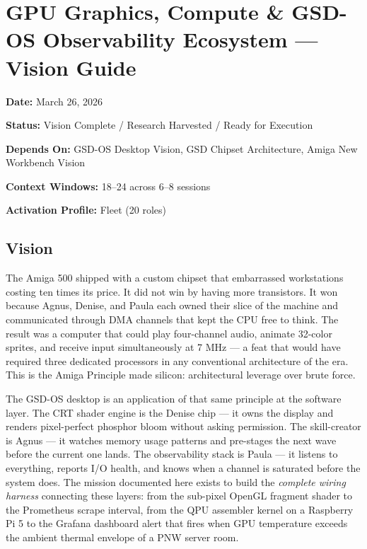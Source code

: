 \documentclass[11pt,letterpaper]{article}
\newcommand{\stageheader}[2]{%
  \noindent\colorbox{#2}{\makebox[\textwidth][l]{%
    \textcolor{white}{\bfseries\sffamily\hspace{6pt}#1\hspace{6pt}}}}%
  \vspace{0.5em}\par%
}
\newcommand{\metafield}[2]{\textbf{\sffamily #1} #2\par}
\begin{document}

\stageheader{STAGE 1 --- VISION DOCUMENT}{primary}

\section{GPU Graphics, Compute \& GSD-OS Observability Ecosystem --- Vision Guide}

\metafield{Date:}{March 26, 2026}
\metafield{Status:}{Vision Complete / Research Harvested / Ready for Execution}
\metafield{Depends On:}{GSD-OS Desktop Vision, GSD Chipset Architecture, Amiga New Workbench Vision}
\metafield{Context Windows:}{18--24 across 6--8 sessions}
\metafield{Activation Profile:}{Fleet (20 roles)}

\subsection{Vision}

The Amiga 500 shipped with a custom chipset that embarrassed workstations costing ten times its price. It did not win by having more transistors. It won because Agnus, Denise, and Paula each owned their slice of the machine and communicated through DMA channels that kept the CPU free to think. The result was a computer that could play four-channel audio, animate 32-color sprites, and receive input simultaneously at 7 MHz — a feat that would have required three dedicated processors in any conventional architecture of the era. This is the Amiga Principle made silicon: architectural leverage over brute force.

The GSD-OS desktop is an application of that same principle at the software layer. The CRT shader engine is the Denise chip — it owns the display and renders pixel-perfect phosphor bloom without asking permission. The skill-creator is Agnus — it watches memory usage patterns and pre-stages the next wave before the current one lands. The observability stack is Paula — it listens to everything, reports I/O health, and knows when a channel is saturated before the system does. The mission documented here exists to build the \emph{complete wiring harness} connecting these layers: from the sub-pixel OpenGL fragment shader to the Prometheus scrape interval, from the QPU assembler kernel on a Raspberry Pi 5 to the Grafana dashboard alert that fires when GPU temperature exceeds the ambient thermal envelope of a PNW server room.
\end{document}
